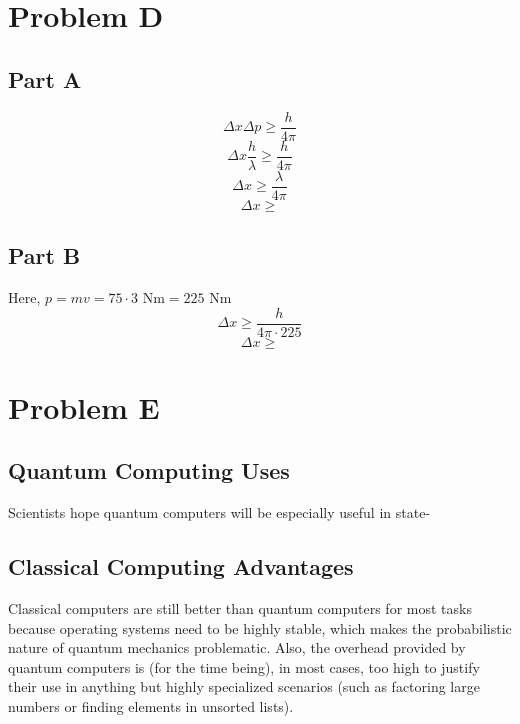\documentclass{article}
\begin{document}
\section{Problem D}
\subsection{Part A}
\[\Delta x \Delta p \ge\frac{h}{4\pi}\]
\[\Delta x \frac{h}{\lambda} \ge \frac{h}{4\pi}\]
\[\Delta x \ge \frac{\lambda}{4\pi}\]
\[\boxed{\Delta x \ge }\]
\subsection{Part B}
Here, $p = mv = 75 \cdot 3 \text{ Nm} = 225 \text{ Nm}$
\[\Delta x \ge \frac{h}{4\pi \cdot 225}\]
\[\boxed{\Delta x \ge }\]
\section{Problem E}
\subsection{Quantum Computing Uses}
Scientists hope quantum computers will be especially useful in state-
\subsection{Classical Computing Advantages}
Classical computers are still better than quantum computers for most tasks because operating systems need to be highly stable, which makes the probabilistic nature of quantum mechanics problematic. 
Also, the overhead provided by quantum computers is (for the time being), in most cases, too high to justify their use in anything but highly specialized scenarios (such as factoring large numbers or finding elements in unsorted lists).
\end{document}
